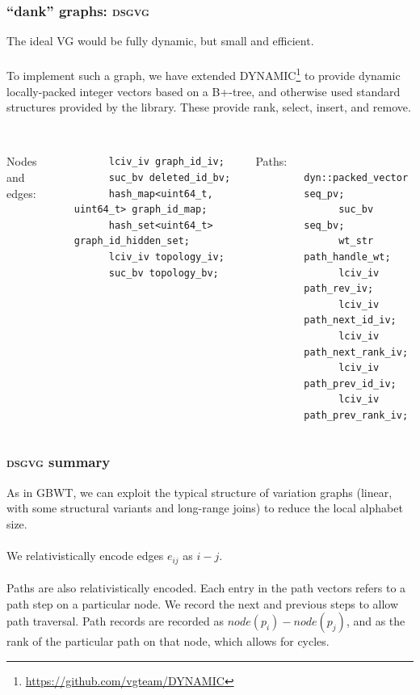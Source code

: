 \documentclass{beamer}
\begin{document}
\begin{frame}[fragile]
  \frametitle{``dank'' graphs: \textsc{dsgvg}}
  The ideal VG would be fully dynamic, but small and efficient.
  \\~\\
  To implement such a graph, we have extended DYNAMIC\footnote{\url{https://github.com/vgteam/DYNAMIC}} to provide dynamic locally-packed integer vectors based on a B+-tree, and otherwise used standard structures provided by the library. These provide rank, select, insert, and remove.
  \\~\\
  \begin{columns}[c] %

    Nodes and edges:
    \begin{lstlisting}
      lciv_iv graph_id_iv;
      suc_bv deleted_id_bv;
      hash_map<uint64_t, uint64_t> graph_id_map;
      hash_set<uint64_t> graph_id_hidden_set;
      lciv_iv topology_iv;
      suc_bv topology_bv;
    \end{lstlisting}

    Paths:
    \begin{lstlisting}
      dyn::packed_vector seq_pv;
      suc_bv seq_bv;
      wt_str path_handle_wt;
      lciv_iv path_rev_iv;
      lciv_iv path_next_id_iv;
      lciv_iv path_next_rank_iv;
      lciv_iv path_prev_id_iv;
      lciv_iv path_prev_rank_iv;
    \end{lstlisting}
  \end{columns}
\end{frame}

\begin{frame}
  \frametitle{\textsc{dsgvg} summary}
  As in GBWT, we can exploit the typical structure of variation graphs (linear, with some structural variants and long-range joins) to reduce the local alphabet size.
  \\~\\
  We relativistically encode edges $e_{ij}$ as $i - j$.
  \\~\\
  Paths are also relativistically encoded.
  Each entry in the path vectors refers to a path step on a particular node.
  We record the next and previous steps to allow path traversal.
  Path records are recorded as $node(p_i) - node(p_j)$, and as the rank of the particular path on that node, which allows for cycles.
\end{frame}
\end{document}
